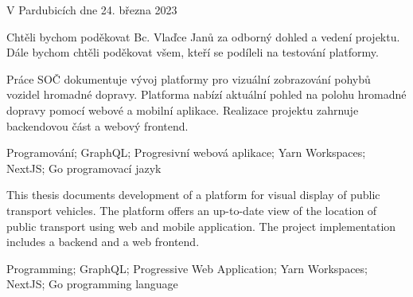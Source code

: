 \vspace{24 pt}

\noindent V Pardubicích dne 24. března 2023 \dotfill{}

\hspace{5.75cm} \authorName

\cleardoublepage

\vspace*{0.8\textheight}

\noindent
Chtěli bychom poděkovat Bc. Vlaďce Janů za odborný dohled a vedení projektu. %
Dále bychom chtěli poděkovat všem, kteří se podíleli na testování platformy.

\cleardoublepage


\noindent Práce SOČ dokumentuje vývoj platformy pro vizuální zobrazování pohybů vozidel hromadné dopravy. Platforma nabízí aktuální pohled na polohu hromadné dopravy pomocí webové a mobilní aplikace. Realizace projektu zahrnuje backendovou část a webový frontend.

\vspace{18pt}


\noindent Programování; GraphQL; Progresivní webová aplikace; Yarn Workspaces; NextJS; Go programovací jazyk
\vspace{18pt}


\noindent This thesis documents development of a platform for visual display of public transport vehicles. The platform offers an up-to-date view of the location of public transport using web and mobile application. The project implementation includes a backend and a web frontend.

\vspace{18pt}


\noindent Programming; GraphQL; Progressive Web Application; Yarn Workspaces; NextJS; Go programming language

\cleardoublepage
